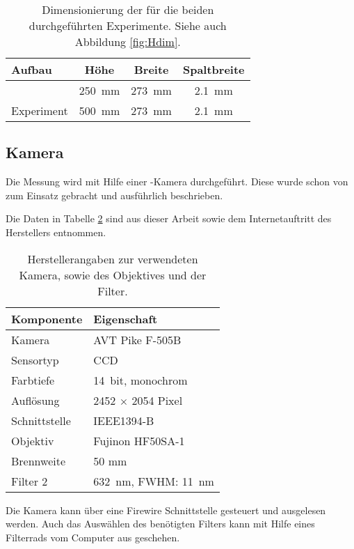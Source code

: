 \begin{table}[b]
  \begin{tabularx}{\linewidth}{X|c|c|c} %
    Aufbau			& Höhe				& Breite			& Spaltbreite \\
    \hline\hline
    \COTm 			& \SI{ 250}{\milli\meter}	& \SI{273}{\milli\meter}	& \SI[round-precision=1]{2,1}{\milli\meter} \\
    Experiment			& \SI{ 500}{\milli\meter}	& \SI{273}{\milli\meter}	& \SI[round-precision=1]{2,1}{\milli\meter}
  \end{tabularx}
  \caption{Dimensionierung der \HSCs für die beiden durchgeführten Experimente. Siehe auch Abbildung \ref{fig:Hdim}.}
  \label{tab:Hdim}
\end{table}

\subsection{Kamera}
\label{sec:cam}
Die Messung wird mit Hilfe einer -Kamera durchgeführt. Diese wurde schon von \cite{heberle} zum Einsatz gebracht und ausführlich
beschrieben. 

Die Daten in Tabelle \ref{tab:cam} sind aus dieser Arbeit sowie dem Internetauftritt des Herstellers \citep{pike_sheet} entnommen. 
\begin{table}[b]
 \begin{tabularx}{\linewidth}{X|X}
  Komponente	& Eigenschaft \\
  \hline\hline
  Kamera	& AVT Pike F-505B \\
  Sensortyp	& CCD \\
  Farbtiefe	& \SI{14}{bit}, monochrom \\
  Auflösung	& 2452 $\times$ 2054 Pixel \\
  Schnittstelle	& IEEE1394-B \\
  \hline
  Objektiv	& Fujinon HF50SA-1 \\
  Brennweite	& 50 mm \\
  \hline
  Filter 2	& \SI{632}{\nano\meter}, FWHM: \SI{11}{\nano\meter} 
 \end{tabularx}
 \caption{Herstellerangaben zur verwendeten Kamera, sowie des Objektives und der Filter.}
 \label{tab:cam}
\end{table}
Die Kamera kann über eine Firewire Schnittstelle gesteuert und ausgelesen werden. Auch das Auswählen des benötigten Filters kann mit Hilfe eines Filterrads
vom Computer aus geschehen.


